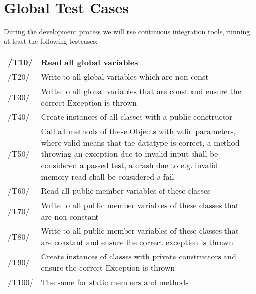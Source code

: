 \chapter{Global Test Cases}
During the development process we will use continuous integration tools, running at least the following testcases: \\

\begin{longtable}{|p{1cm} | p{15cm}|}
  \hline
  /T10/ & Read all global variables \\
  \hline
  /T20/ & Write to all global variables which are non const \\
  \hline
  /T30/ & Write to all global variables that are const and ensure the correct Exception is thrown \\
  \hline
  /T40/ & Create instances of all classes with a public constructor \\
  \hline
  /T50/ & Call all methods of these Objects with valid parameters, where valid means that the 	datatype is correct, a method throwing an exception due to invalid input shall be considered a passed test, a crash due to e.g. invalid memory read shall be considered a fail \\
  \hline
  /T60/ & Read all public member variables of these classes \\
  \hline
  /T70/ & Write to all public member variables of these classes that are non constant \\
  \hline
  /T80/ & Write to all public member variables of these classes that are constant and ensure the correct exception is thrown \\
  \hline
  /T90/ & Create instances of classes with private constructors and ensure the correct Exception is thrown \\
  \hline
  /T100/ &  The same for static members and methods \\
   \hline
\end{longtable}
